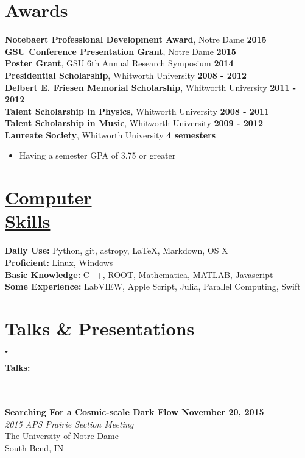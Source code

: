 \documentclass[margin]{res}
\begin{document}
\begin{resume}
\section{Awards}
{\bf Notebaert Professional Development Award}, Notre Dame  \hfill {\bf 2015}  \\
{\bf GSU Conference Presentation Grant}, Notre Dame  \hfill {\bf 2015}  \\
{\bf Poster Grant}, GSU 6th Annual Research Symposium \hfill {\bf 2014}  \\
{\bf Presidential Scholarship}, Whitworth University \hfill {\bf2008 - 2012} \\
{\bf Delbert E. Friesen Memorial Scholarship}, Whitworth University \hfill {\bf2011 - 2012} \\
{\bf Talent Scholarship in Physics}, Whitworth University \hfill {\bf2008 - 2011} \\
{\bf Talent Scholarship in Music}, Whitworth University \hfill {\bf2009 - 2012} \\
{\bf Laureate Society}, Whitworth University \hfill {\bf4 semesters}
\begin{itemize}  \itemsep -2pt %
     \item Having a semester GPA of 3.75 or greater
\end{itemize}








\section{\href{https://github.com/brose3}{Computer \\Skills}}
{\bf Daily Use:} Python, git, astropy, \LaTeX, Markdown, OS X \\
{\bf Proficient:} Linux, Windows \\
{\bf Basic Knowledge:} C++, ROOT, Mathematica, MATLAB, Javascript\\
{\bf Some Experience:} LabVIEW, Apple Script, Julia, Parallel Computing, Swift \\






\section{Talks \& Presentations}

 $_{•}    $\\\centerline{\bf Talks:} \\ \\
{\bf Searching For a Cosmic-scale Dark Flow \hfill November 20, 2015} \\
{\sl 2015 APS Prairie Section Meeting} \\
The University of Notre Dame \\
South Bend, IN



\end{resume}
\end{document}
